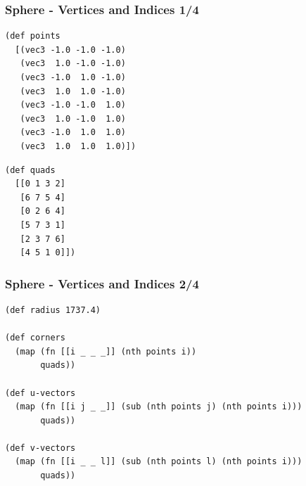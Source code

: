 \documentclass[aspectratio=169,11pt,xcolor=dvipsnames]{beamer}
\begin{document}
\begin{frame}[fragile]
  \frametitle{Sphere {-} Vertices and Indices 1/4}
  \begin{center}
    \begin{minipage}[t]{.4\textwidth}
      \begin{verbatim}
(def points
  [(vec3 -1.0 -1.0 -1.0)
   (vec3  1.0 -1.0 -1.0)
   (vec3 -1.0  1.0 -1.0)
   (vec3  1.0  1.0 -1.0)
   (vec3 -1.0 -1.0  1.0)
   (vec3  1.0 -1.0  1.0)
   (vec3 -1.0  1.0  1.0)
   (vec3  1.0  1.0  1.0)])
      \end{verbatim}
    \end{minipage}
    \begin{minipage}[t]{.4\textwidth}
      \begin{verbatim}
(def quads
  [[0 1 3 2]
   [6 7 5 4]
   [0 2 6 4]
   [5 7 3 1]
   [2 3 7 6]
   [4 5 1 0]])
      \end{verbatim}
    \end{minipage}
  \end{center}
\end{frame}

\begin{frame}[fragile]
  \frametitle{Sphere {-} Vertices and Indices 2/4}
  \begin{verbatim}
(def radius 1737.4)

(def corners
  (map (fn [[i _ _ _]] (nth points i))
       quads))

(def u-vectors
  (map (fn [[i j _ _]] (sub (nth points j) (nth points i)))
       quads))

(def v-vectors
  (map (fn [[i _ _ l]] (sub (nth points l) (nth points i)))
       quads))
  \end{verbatim}
\end{frame}
\end{document}

